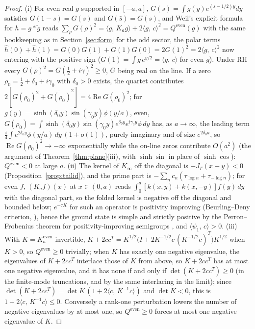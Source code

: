 \documentclass[11pt]{article}
\theoremstyle{definition}
\theoremstyle{remark}
\newcommand{\ip}[2]{\langle #1,\, #2\rangle}
\DeclareMathOperator{\Ree}{Re}
\begin{document}
\begin{proof}
(i) For even real $g$ supported in $[-a,a]$, $G(s)=\int g(y)e^{(s-1/2)y}dy$ satisfies $G(1-s)=G(s)$ and $G(\bar s)=\overline{G(s)}$, and Weil's explicit formula for $h=g*\tilde g$ reads $\sum_\rho G(\rho)^2=\ip g{K_ag}+2\ip gc^2=Q^{\mathrm{even}}(g)$ with the same bookkeeping as in Section~\ref{sec:form} for the odd sector, the polar terms $\hat h(0)+\hat h(1)=G(0)G(1)+G(1)G(0)=2G(1)^2=2\ip gc^2$ now entering with the positive sign ($G(1)=\int g\,e^{y/2}=\ip gc$ for even $g$). Under RH every $G(\rho)^2=G(\tfrac12+i\gamma)^2\ge0$, $G$ being real on the line. If a zero $\rho_0=\tfrac12+\delta_0+i\gamma_0$ with $\delta_0>0$ exists, the quartet contributes $2[G(\rho_0)^2+\overline{G(\rho_0)}^2]=4\Ree G(\rho_0)^2$; for $g(y)=\sinh(\delta_0y)\sin(\gamma_0y)\phi(y/a)$, even, $G(\rho_0)=\int\sinh(\delta_0y)\sin(\gamma_0y)e^{\delta_0y}e^{i\gamma_0y}\phi\,dy$ has, as $a\to\infty$, the leading term $\frac i4\int e^{2\delta_0y}\phi(y/a)\,dy\,(1+o(1))$, purely imaginary and of size $e^{2\delta_0a}$, so $\Ree G(\rho_0)^2\to-\infty$ exponentially while the on-line zeros contribute $O(a^2)$ (the argument of Theorem~\ref{thm:plane}(iii), with $\sinh\sin$ in place of $\sinh\cos$): $Q^{\mathrm{even}}<0$ at large $a$. (ii) The kernel of $K_\infty$ off the diagonal is $-J_\Gamma(x-y)<0$ (Proposition~\ref{prop:tailid}), and the prime part is $-\sum_nc_n(\tau_{\log n}+\tau_{-\log n})$; for even $f$, $(K_af)(x)$ at $x\in(0,a)$ reads $\int_0^a[k(x,y)+k(x,-y)]f(y)\,dy$ with the diagonal part, so the folded kernel is negative off the diagonal and bounded below; $e^{-\tau K}$ for such an operator is positivity improving (Beurling--Deny criterion, \cite[Thm.~XIII.44 ff.]{reed-simon4}), hence the ground state is simple and strictly positive by the Perron--Frobenius theorem for positivity-improving semigroups \cite[Thm.~XIII.44]{reed-simon4}, and $\ip{\psi_1}c>0$. (iii) With $K=K_a^{\mathrm{even}}$ invertible, $K+2cc^T=K^{1/2}\big(I+2K^{-1/2}c\,(K^{-1/2}c)^T\big)K^{1/2}$ when $K>0$, so $Q^{\mathrm{even}}\ge0$ trivially; when $K$ has exactly one negative eigenvalue, the eigenvalues of $K+2cc^T$ interlace those of $K$ from above, so $K+2cc^T$ has at most one negative eigenvalue, and it has none if and only if $\det(K+2cc^T)\ge0$ (in the finite-mode truncations, and by the same interlacing in the limit); since $\det(K+2cc^T)=\det K\,(1+2\ip c{K^{-1}c})$ and $\det K<0$, this is $1+2\ip c{K^{-1}c}\le0$. Conversely a rank-one perturbation lowers the number of negative eigenvalues by at most one, so $Q^{\mathrm{even}}\ge0$ forces at most one negative eigenvalue of $K$.
\end{proof}
\end{document}
